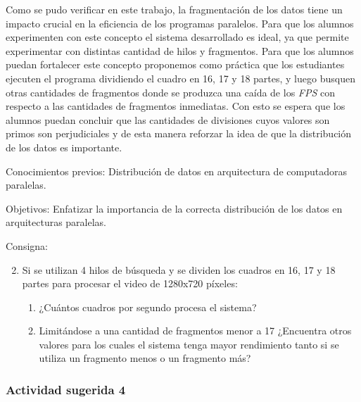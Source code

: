 Como se pudo verificar en este trabajo, la fragmentación de los datos tiene un
impacto crucial en la eficiencia de los programas paralelos. Para que los
alumnos experimenten con este concepto el sistema desarrollado es ideal, ya que
permite experimentar con distintas cantidad de hilos y fragmentos. Para que los
alumnos puedan fortalecer este concepto proponemos como práctica que los
estudiantes ejecuten el programa dividiendo el cuadro en 16, 17 y 18 partes, y
luego busquen otras cantidades de fragmentos donde se produzca una caída de los
\emph{FPS} con respecto a las cantidades de fragmentos inmediatas. Con esto se
espera que los alumnos puedan concluir que las cantidades de divisiones cuyos
valores son primos son perjudiciales y de esta manera reforzar la idea de que la
distribución de los datos es importante.

\begin{description}

	\item{Conocimientos previos}: Distribución de datos en arquitectura de
		computadoras paralelas.

	\item{Objetivos}: Enfatizar la importancia de la correcta distribución
		de los datos en arquitecturas paralelas.

	\item{Consigna}: \begin{enumerate}
	
	\setcounter{enumi}{1}

	\item{Si se utilizan 4 hilos de búsqueda y se dividen los cuadros en 16,
		17 y 18 partes para procesar el video de 1280x720 píxeles:

\begin{enumerate}

	\item{¿Cuántos cuadros por segundo procesa el sistema?}

	\item{Limitándose a una cantidad de fragmentos menor a 17 ¿Encuentra
		otros valores para los cuales el sistema tenga mayor rendimiento
		tanto si se utiliza un fragmento menos o un fragmento más?}

\end{enumerate}}

\end{enumerate}

\end{description}

\subsubsection{Actividad sugerida 4}

